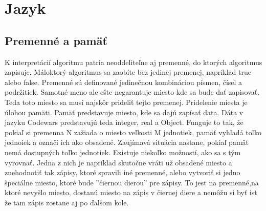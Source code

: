 \section{Jazyk}
\subsection{Premenné a pamäť}
K interpretácií algoritmu patria neoddeliteľne aj premenné, do ktorých algoritmus zapisuje, Máloktorý algoritmus sa zaobíte bez jedinej premenej, napríklad true alebo false. Premenné sú definované jedinečnou kombináciou písmen, čísel a podržitiek. Samotné meno ale ešte negarantuje miesto kde sa bude dať zapisovať. Teda toto miesto sa musí najskôr prideliť tejto premenej. Pridelenie miesta je úlohou pamäti. 
Pamäť predstavuje miesto, kde sa dajú zapísať data. Dáta v jazyku Codewars predstavujú teda integer, real a Object. Funguje to tak, že pokiaľ si premenna N zažiada o miesto veľkosti M jednotiek, pamäť vyhľadá toľko jednoiek a označí ich ako obsadené. Zaujímavá situácia nastane, pokiaľ pamäť nemá dostupných toľko jednotiek. Existuje niekoľko možností, ako sa s tým vyrovnať. Jedna z nich je napríklad skutočne vráti už obsadené miesto a znehodnotiť tak zápisy, ktoré spravili iné premenné, alebo vytvoriť si jedno špeciálne miesto, ktoré bude ''čiernou dierou'' pre zápisy. To jest na premenné,na ktoré nevyšlo miesto, dostanú miesto na zápis v čiernej diere a nemôžu si byť ist že tam zápis zostane aj po ďalšom kole.

